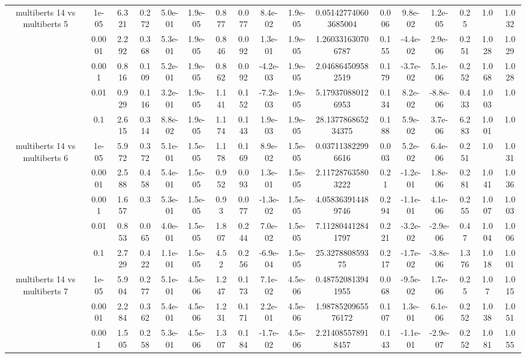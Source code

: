 \begin{tabular}{|c|c|c|c|c|c|c|c|c|c|c|c|c|c|c|c|c|}
\hline
\multirow{5}{*}{multiberts 14 vs multiberts 5} & 1e-05 & 6.321 & 0.272 & 5.0e-01 & 1.9e-05 & 0.877 & 0.077 & 8.4e-02 & 1.9e-05 & 0.051427740603685004 & 0.006 & 9.8e-02 & 1.2e-05 & 0.25 & 1.0 & 1.032 \\
 & 0.0001 & 2.292 & 0.368 & 5.3e-01 & 1.9e-05 & 0.846 & 0.092 & 1.3e-01 & 1.9e-05 & 1.260331630706787 & 0.155 & -4.4e-02 & 2.9e-06 & 0.251 & 1.028 & 1.029 \\
 & 0.001 & 0.816 & 0.109 & 5.2e-01 & 1.9e-05 & 0.862 & 0.092 & -4.2e-03 & 1.9e-05 & 2.046864509582519 & 0.179 & -3.7e-02 & 5.1e-06 & 0.252 & 1.068 & 1.028 \\
 & 0.01 & 0.929 & 0.116 & 3.2e-01 & 1.9e-05 & 1.141 & 0.152 & -7.2e-03 & 1.9e-05 & 5.179370880126953 & 0.134 & 8.2e-02 & -8.8e-06 & 0.433 & 1.003 & 1.0 \\
 & 0.1 & 2.615 & 0.314 & 8.8e-02 & 1.9e-05 & 1.174 & 0.143 & 1.9e-03 & 1.9e-05 & 28.137786865234375 & 0.188 & 5.9e-02 & 3.7e-06 & 6.283 & 1.001 & 1.0 \\
\hline
\multirow{5}{*}{multiberts 14 vs multiberts 6} & 1e-05 & 5.972 & 0.372 & 5.1e-01 & 1.5e-05 & 1.178 & 0.169 & 8.9e-02 & 1.5e-05 & 0.037113822996616 & 0.003 & 5.2e-02 & 6.4e-06 & 0.251 & 1.0 & 1.031 \\
 & 0.0001 & 2.588 & 0.458 & 5.4e-01 & 1.5e-05 & 0.952 & 0.093 & 1.3e-01 & 1.5e-05 & 2.117287635803222 & 0.21 & -1.2e-01 & 1.8e-06 & 0.281 & 1.041 & 1.036 \\
 & 0.001 & 1.657 & 0.3 & 5.3e-01 & 1.5e-05 & 0.93 & 0.077 & -1.3e-02 & 1.5e-05 & 4.058363914489746 & 0.294 & -1.1e-01 & 4.1e-06 & 0.255 & 1.007 & 1.003 \\
 & 0.01 & 0.853 & 0.065 & 4.0e-01 & 1.5e-05 & 1.807 & 0.244 & 7.0e-02 & 1.5e-05 & 7.112804412841797 & 0.221 & -3.2e-02 & -2.9e-06 & 0.47 & 1.004 & 1.006 \\
 & 0.1 & 2.729 & 0.422 & 1.1e-01 & 1.5e-05 & 4.52 & 0.256 & -6.9e-04 & 1.5e-05 & 25.327880859375 & 0.217 & -1.7e-02 & -3.8e-06 & 1.376 & 1.018 & 1.001 \\
\hline
\multirow{5}{*}{multiberts 14 vs multiberts 7} & 1e-05 & 5.904 & 0.277 & 5.1e-01 & 4.5e-06 & 1.247 & 0.173 & 7.1e-02 & 4.5e-06 & 0.487520813941955 & 0.068 & -9.5e-02 & 1.7e-06 & 0.25 & 1.07 & 1.015 \\
 & 0.0001 & 2.284 & 0.362 & 5.4e-01 & 4.5e-06 & 1.231 & 0.171 & 2.2e-01 & 4.5e-06 & 1.9878520965576172 & 0.107 & 1.3e-01 & 6.1e-06 & 0.252 & 1.038 & 1.051 \\
 & 0.001 & 1.505 & 0.258 & 5.3e-01 & 4.5e-06 & 1.307 & 0.184 & -1.7e-02 & 4.5e-06 & 2.214085578918457 & 0.143 & -1.1e-01 & -2.9e-07 & 0.252 & 1.081 & 1.055 \\

\end{tabular}
